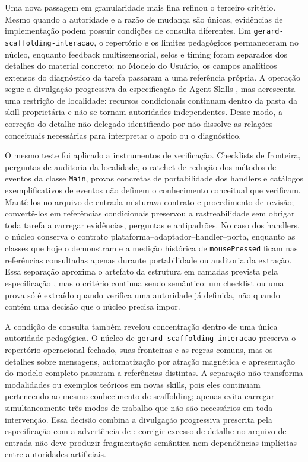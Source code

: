 \documentclass[preprint,12pt,authoryear]{elsarticle}
\begin{document}
Uma nova passagem em granularidade mais fina refinou o terceiro critério. Mesmo quando a autoridade e a razão de mudança são únicas, evidências de implementação podem possuir condições de consulta diferentes. Em \texttt{gerard-scaffolding-interacao}, o repertório e os limites pedagógicos permaneceram no núcleo, enquanto feedback multissensorial, selos e timing foram separados dos detalhes do material concreto; no Modelo do Usuário, os campos analíticos extensos do diagnóstico da tarefa passaram a uma referência própria. A operação segue a divulgação progressiva da especificação de Agent Skills \citep{agentskills2026spec}, mas acrescenta uma restrição de localidade: recursos condicionais continuam dentro da pasta da skill proprietária e não se tornam autoridades independentes. Desse modo, a correção do detalhe não delegado identificado por \citet{hong2026smells} não dissolve as relações conceituais necessárias para interpretar o apoio ou o diagnóstico.

O mesmo teste foi aplicado a instrumentos de verificação. Checklists de fronteira, perguntas de auditoria da localidade, o ratchet de redução dos métodos de eventos da classe \texttt{Main}, provas concretas de portabilidade dos handlers e catálogos exemplificativos de eventos não definem o conhecimento conceitual que verificam. Mantê-los no arquivo de entrada misturava contrato e procedimento de revisão; convertê-los em referências condicionais preservou a rastreabilidade sem obrigar toda tarefa a carregar evidências, perguntas e antipadrões. No caso dos handlers, o núcleo conserva o contrato plataforma--adaptador--handler--porta, enquanto as classes que hoje o demonstram e a medição histórica de \texttt{mousePressed} ficam nas referências consultadas apenas durante portabilidade ou auditoria da extração. Essa separação aproxima o artefato da estrutura em camadas prevista pela especificação \citep{agentskills2026spec}, mas o critério continua sendo semântico: um checklist ou uma prova só é extraído quando verifica uma autoridade já definida, não quando contém uma decisão que o núcleo precisa impor.

A condição de consulta também revelou concentração dentro de uma única autoridade pedagógica. O núcleo de \texttt{gerard-scaffolding-interacao} preserva o repertório operacional fechado, suas fronteiras e as regras comuns, mas os detalhes sobre mensagens, automatização por atração magnética e apresentação do modelo completo passaram a referências distintas. A separação não transforma modalidades ou exemplos teóricos em novas skills, pois eles continuam pertencendo ao mesmo conhecimento de scaffolding; apenas evita carregar simultaneamente três modos de trabalho que não são necessários em toda intervenção. Essa decisão combina a divulgação progressiva prescrita pela especificação \citep{agentskills2026spec} com a advertência de \citet{hong2026smells}: corrigir excesso de detalhe no arquivo de entrada não deve produzir fragmentação semântica nem dependências implícitas entre autoridades artificiais.
\end{document}

